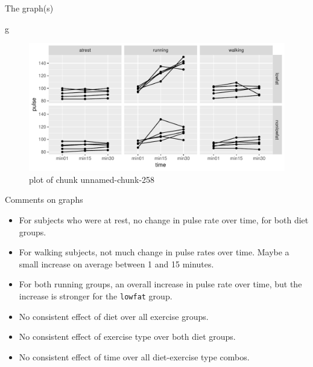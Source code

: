 \documentclass[ignorenonframetext,]{beamer}
\newenvironment{Shaded}{\begin{snugshade}}{\end{snugshade}}
\newcommand{\NormalTok}[1]{#1}
\begin{document}
\begin{frame}[fragile]{The graph(s)}
\protect\hypertarget{the-graphs}{}

\begin{Shaded}
\begin{Highlighting}[]
\NormalTok{g}
\end{Highlighting}
\end{Shaded}

\begin{figure}
\centering
\includegraphics{figure/unnamed-chunk-258-1.pdf}
\caption{plot of chunk unnamed-chunk-258}
\end{figure}

\end{frame}

\begin{frame}[fragile]{Comments on graphs}
\protect\hypertarget{comments-on-graphs}{}

\begin{itemize}
\item
  For subjects who were at rest, no change in pulse rate over time, for
  both diet groups.
\item
  For walking subjects, not much change in pulse rates over time. Maybe
  a small increase on average between 1 and 15 minutes.
\item
  For both running groups, an overall increase in pulse rate over time,
  but the increase is stronger for the \texttt{lowfat} group.
\item
  No consistent effect of diet over all exercise groups.
\item
  No consistent effect of exercise type over both diet groups.
\item
  No consistent effect of time over all diet-exercise type combos.
\end{itemize}

\end{frame}
\end{document}
